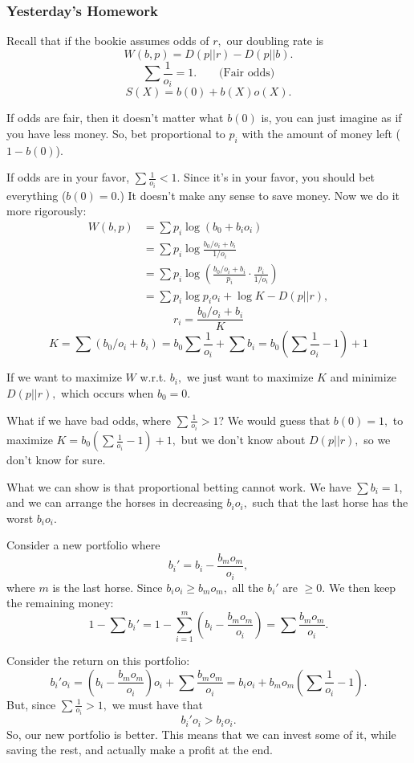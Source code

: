 \documentclass[12pt]{article}
\theoremstyle{remark}
\begin{document}
\subsubsection{Yesterday's Homework}
Recall that if the bookie assumes odds of $r,$ our doubling rate is
\[W(b,p)=D(p||r)-D(p||b).\]
\[\sum \frac{1}{o_i}=1. \qquad{\text{(Fair odds)}}\]
\[S(X) = b(0)+b(X)o(X).\]

If odds are fair, then it doesn't matter what $b(0)$ is, you can just imagine as if you have less money. So, bet proportional to $p_i$ with the amount of money left ($1-b(0)$).

If odds are in your favor, $\sum \frac{1}{o_i}<1$. Since it's in your favor, you should bet everything ($b(0)=0.$) It doesn't make any sense to save money. Now we do it more rigorously:
\begin{align*}W(b,p)&=\sum p_i\log(b_0+b_io_i)\\&=\sum p_i\log\frac{b_0/o_i+b_i}{1/o_i}\\&=\sum p_i\log\left(\frac{{b_0}/{o_i}+b_i}{p_i}\cdot\frac{p_i}{{1}/{o_i}}\right)\\&=\sum p_i\log p_io_i+\log K-D(p||r),\end{align*}
\[r_i = \frac{b_0/o_i+b_i}{K}\]
\[K=\sum \left(b_0/o_i + b_i\right)=b_0\sum \frac{1}{o_i}+\sum b_i=b_0\left(\sum\frac{1}{o_i}-1\right)+1\]

If we want to maximize $W$ w.r.t. $b_i,$ we just want to maximize $K$ and minimize $D(p||r),$ which occurs when $b_0=0.$ 

What if we have bad odds, where
$\sum\frac{1}{o_i}>1$? We would guess that $b(0)=1,$ to maximize $K=b_0\left(\sum\frac{1}{o_i}-1\right)+1,$ but we don't know about $D(p||r),$ so we don't know for sure. 

What we can show is that proportional betting cannot work. We have
$\sum b_i=1$, and we can arrange the horses in decreasing $b_io_i,$ such that the last horse has the worst $b_io_i.$

Consider a new portfolio where
\[b_i'=b_i-\frac{b_m o_m}{o_i},\] where $m$ is the last horse. Since $b_io_i\ge b_m o_m,$ all the $b_i'$ are $\ge 0.$ We then keep the remaining money:
\[1-\sum b_i'=1-\sum_{i=1}^m\left(b_i-\frac{b_m o_m}{o_i}\right)=\sum \frac{b_mo_m}{o_i}.\]

Consider the return on this portfolio:
\[b_i'o_i=\left(b_i-\frac{b_mo_m}{o_i}\right)o_i+\sum \frac{b_mo_m}{o_i}=b_i o_i+b_mo_m\left(\sum\frac{1}{o_i}-1\right).\]
But, since 
$\sum\frac{1}{o_i}>1,$ we must have that 
\[b_i'o_i>b_io_i.\]
So, our new portfolio is better. This means that we can invest some of it, while saving the rest, and actually make a profit at the end. 
\end{document}
